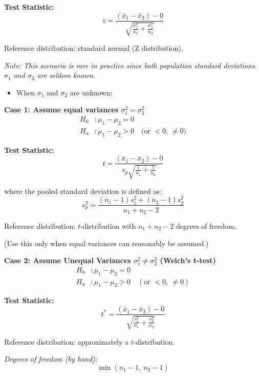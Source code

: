 \textbf{Test Statistic:}
\[
z = \frac{(\bar{x}_1 - \bar{x}_2) - 0}{\sqrt{\frac{\sigma_1^2}{n_1} + \frac{\sigma_2^2}{n_2}}}
\]

Reference distribution: standard normal (Z distribution).

\textit{Note: This scenario is rare in practice since both population standard deviations $\sigma_1$ and $\sigma_2$ are seldom known.}
\vspace{0.5em}
\begin{itemize}
\item When $\sigma_1$ and $\sigma_2$ are unknown: 
\end{itemize}
\vspace{1.0em}
\textbf{Case 1: Assume equal variances $\sigma_1^2 = \sigma_2^2$}
\vspace{0.5em}
\begin{align*}
H_0&: \mu_1 - \mu_2 = 0 \\
H_a&: \mu_1 - \mu_2 > 0 \quad \text{(or } < 0 \text{, } \ne 0 \text{)}
\end{align*}

\textbf{Test Statistic:}
\[
t = \frac{(\bar{x}_1 - \bar{x}_2) - 0}{s_p \sqrt{\frac{1}{n_1} + \frac{1}{n_2}}}
\]

where the pooled standard deviation is defined as:
\[
s_p^2 = \frac{(n_1 - 1)s_1^2 + (n_2 - 1)s_2^2}{n_1 + n_2 - 2}
\]

Reference distribution: $t$-distribution with $n_1 + n_2 - 2$ degrees of freedom.

(Use this only when equal variances can reasonably be assumed.) \\
\vspace{1.0em}

\noindent \textbf{Case 2: Assume Unequal Variances $\sigma_1^2 \ne \sigma_2^2$ (Welch's t-test)}
\vspace{0.5em}
\begin{align*}
H_0 &: \mu_1 - \mu_2 = 0 \\
H_a &: \mu_1 - \mu_2 > 0 \quad (\text{or } < 0,\ \ne 0)
\end{align*}

\textbf{Test Statistic:}
\[
t^* = \frac{(\bar{x}_1 - \bar{x}_2) - 0}{\sqrt{\frac{s_1^2}{n_1} + \frac{s_2^2}{n_2}}}
\]

Reference distribution: approximately a $t$-distribution.

\vspace{0.5em}
\textit{Degrees of freedom (by hand):}
\[
\min(n_1 - 1,\ n_2 - 1)
\]

